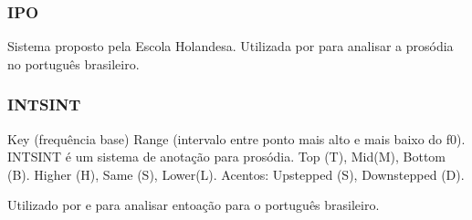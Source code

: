 \subsubsection{IPO}
Sistema proposto pela Escola Holandesa. Utilizada por \cite{ipo} para analisar a
prosódia no português brasileiro.
\subsubsection{INTSINT}
Key (frequência base)
Range (intervalo entre ponto mais alto e mais baixo do f0).
INTSINT é um sistema de anotação para prosódia. Top (T), Mid(M), Bottom (B).
Higher (H), Same (S), Lower(L). Acentos: Upstepped (S), Downstepped (D).

Utilizado por \cite{intsintpt} e \cite{moraes1998}para analisar entoação para o
português brasileiro.

